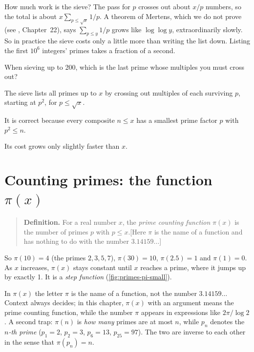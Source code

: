 How much work is the sieve? The pass for $p$ crosses out about $x/p$ numbers, so the total is about $x\sum_{p\le\sqrt x}1/p$. A theorem of Mertens, which we do not prove (see \cite{hardywright}, Chapter~22), says $\sum_{p\le y}1/p$ grows like $\log\log y$, extraordinarily slowly. So in practice the sieve costs only a little more than writing the list down. Listing the first $10^6$ integers' primes takes a fraction of a second.

\begin{checkpoint}
When sieving up to 200, which is the last prime whose multiples you must cross out?
\end{checkpoint}

\begin{keyideas}
\item The sieve lists all primes up to $x$ by crossing out multiples of each surviving $p$, starting at $p^2$, for $p\le\sqrt x$.
\item It is correct because every composite $n\le x$ has a smallest prime factor $p$ with $p^2\le n$.
\item Its cost grows only slightly faster than $x$.
\end{keyideas}

\section{Counting primes: the function $\pi(x)$}\label{sec:primes-pi}

\begin{quote}
\textbf{Definition.} For a real number $x$, the \emph{prime counting function} $\pi(x)$ is the number of primes $p$ with $p\le x$.[Here $\pi$ is the name of a function and has nothing to do with the number $3.14159\ldots$]
\end{quote}

So $\pi(10)=4$ (the primes $2,3,5,7$), $\pi(30)=10$, $\pi(2.5)=1$ and $\pi(1)=0$. As $x$ increases, $\pi(x)$ stays constant until $x$ reaches a prime, where it jumps up by exactly 1. It is a \emph{step function} (\cref{fig:primes-pi-small}).

\begin{pitfall}
In $\pi(x)$ the letter $\pi$ is the name of a function, not the number $3.14159\ldots$ Context always decides; in this chapter, $\pi(x)$ with an argument means the prime counting function, while the number $\pi$ appears in expressions like $2\pi/\log2$. A second trap: $\pi(n)$ is \emph{how many} primes are at most $n$, while $p_n$ denotes the \emph{$n$-th prime} ($p_1=2$, $p_2=3$, $p_6=13$, $p_{25}=97$). The two are inverse to each other in the sense that $\pi(p_n)=n$.
\end{pitfall}


